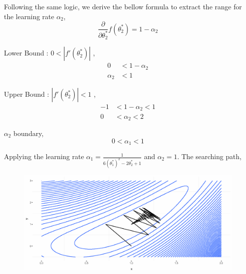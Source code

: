 \documentclass[12pt,a4paper]{article}%
\theoremstyle{definition}
\theoremstyle{plain}
\numberwithin{equation}{section}
\begin{document}
Following the same logic, we derive the bellow formula to extract the range for the learning rate $\alpha_{2}$, 
\begin{equation*}
\frac{\partial}{\partial \theta_{2}^{*}}f(\theta_{2}^{*}) = 1 - \alpha_{2}
\end{equation*}

Lower Bound : $0<|f'(\theta_{2}^{*})|$ , 
\begin{align*}
0 &< 1-\alpha_{2} \\
\alpha_{2} &< 1
\end{align*}


Upper Bound : $|f'(\theta_{2}^{*})|<1$ , 
\begin{align*}
-1 &< 1-\alpha_{2} < 1 \\
0 &< \alpha_{2} < 2
\end{align*}

$\alpha_{2}$ boundary,
\begin{equation*}
0 < \alpha_{1} < 1
\end{equation*}

Applying the learning rate $\alpha_{1} = \frac{1}{6(\theta_{1}^{*})^{2} - 2 \theta_{2}^{*}+1}$ and $\alpha_{2} = 1 $. The searching path,

\begin{figure}[H]
\centering
{}
\includegraphics[scale=0.8]{images//searching.eps}
\\~\\
\end{figure}
\end{document}
